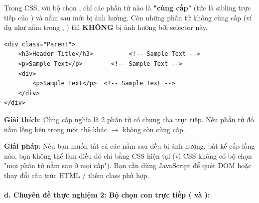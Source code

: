 \begin{conceptBox}
\begin{center}
\end{center}
\end{conceptBox}

\begin{warnBox}
Trong CSS, với bộ chọn , chỉ các phần tử  nào là \textbf{"cùng cấp"} (tức là sibling trực tiếp của ) và nằm sau  mới bị ảnh hưởng. Còn những phần tử  không cùng cấp (ví dụ như nằm trong , ) thì \textbf{KHÔNG} bị ảnh hưởng bởi selector này.
\par\vspace{3pt}
\begin{codeWindow}
\begin{lstlisting}[language=HTML5]
<div class="Parent">
    <h3>Header Title</h3>          <!-- Sample Text -->
    <p>Sample Text</p>        <!-- Sample Text -->
    <div>
        <p>Sample Text</p>  <!-- Sample Text -->
    </div>
</div>
\end{lstlisting}
\end{codeWindow}
\textbf{Giải thích}: Cùng cấp nghĩa là 2 phần tử có chung cha trực tiếp. Nếu phần tử đó nằm lồng bên trong một thẻ khác $\rightarrow$ không còn cùng cấp.
\par\vspace{3pt}
\textbf{Giải pháp}: Nếu bạn muốn tất cả các  nằm sau  đều bị ảnh hưởng, bất kể cấp lồng nào, bạn không thể làm điều đó chỉ bằng CSS hiện tại (vì CSS không có bộ chọn "mọi phần tử nằm sau ở mọi cấp"). Bạn cần dùng JavaScript để quét DOM hoặc thay đổi cấu trúc HTML / thêm class phù hợp.
\end{warnBox}

\paragraph{d. Chuyên đề thực nghiệm 2: Bộ chọn con trực tiếp ( và ):}

